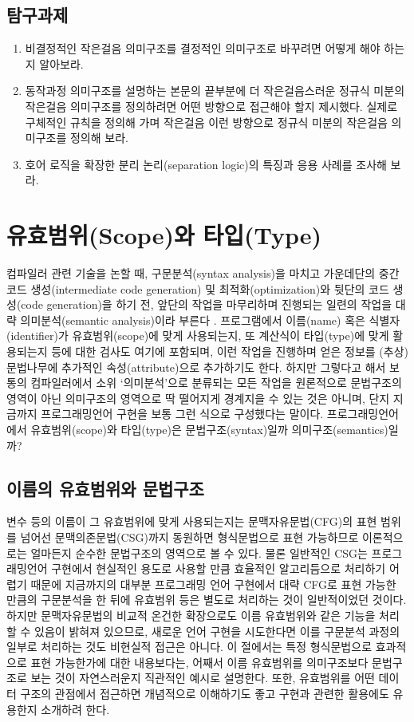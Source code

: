 \section*{탐구과제}
\begin{enumerate}
 \item 비결정적인 작은걸음 의미구조를 결정적인 의미구조로 바꾸려면
       어떻게 해야 하는지 알아보라.
 \item 동작과정 의미구조를 설명하는 본문의 끝부분에 더 작은걸음스러운
       정규식 미분의 작은걸음 의미구조를 정의하려면 어떤 방향으로 접근해야
       할지 제시했다. 실제로 구체적인 규칙을 정의해 가며 작은걸음 이런
       방향으로 정규식 미분의 작은걸음 의미구조를 정의해 보라.
 \item 호어 로직을 확장한 분리 논리(separation logic)의 특징과 응용 사례를 조사해 보라.
\end{enumerate}

\chapter{유효범위(Scope)와 타입(Type)}
컴파일러 관련 기술을 논할 때, 구문분석(syntax analysis)을 마치고
가운데단의 중간 코드 생성(intermediate code generation) 및
최적화(optimization)와 뒷단의 코드 생성(code generation)을 하기 전,
앞단의 작업을 마무리하며 진행되는 일련의 작업을 대략
의미분석(semantic analysis)이라 부른다 \cite{Aho2013compilers2nd}.
프로그램에서 이름(name) 혹은 식별자(identifier)가 유효범위(scope)에
맞게 사용되는지, 또 계산식이 타입(type)에 맞게 활용되는지 등에 대한
검사도 여기에 포함되며, 이런 작업을 진행하며 얻은 정보를 (추상)문법나무에
추가적인 속성(attribute)으로 추가하기도 한다. 하지만 그렇다고 해서
보통의 컴파일러에서 소위 `의미분석'으로 분류되는 모든 작업을 원론적으로
문법구조의 영역이 아닌 의미구조의 영역으로 딱 떨어지게 경계지을 수 있는
것은 아니며, 단지 지금까지 프로그래밍언어 구현을 보통 그런 식으로
구성했다는 말이다. 프로그래밍언어에서 유효범위(scope)와 타입(type)은
문법구조(syntax)일까 의미구조(semantics)일까?

\newpage

\section{이름의 유효범위와 문법구조}
변수 등의 이름이 그 유효범위에 맞게 사용되는지는 문맥자유문법(CFG)의
표현 범위를 넘어선 문맥의존문법(CSG)까지 동원하면 형식문법으로 표현
가능하므로 이론적으로는 얼마든지 순수한 문법구조의 영역으로 볼 수 있다.
물론 일반적인 CSG는 프로그래밍언어 구현에서 현실적인 용도로 사용할 만큼
효율적인 알고리듬으로 처리하기 어렵기 때문에 지금까지의 대부분 프로그래밍
언어 구현에서 대략 CFG로 표현 가능한 만큼의 구문분석을 한 뒤에
유효범위 등은 별도로 처리하는 것이 일반적이었던 것이다. 하지만
문맥자유문법의 비교적 온건한 확장\cite{Okhotin2005existence}으로도
이름 유효범위와 같은 기능을 처리할 수 있음이 밝혀져 있으므로, 새로운
언어 구현을 시도한다면 이를 구문분석 과정의 일부로 처리하는 것도
비현실적 접근은 아니다. 이 절에서는 특정 형식문법으로 효과적으로
표현 가능한가에 대한 내용보다는, 어째서 이름 유효범위를 의미구조보다
문법구조로 보는 것이 자연스러운지 직관적인 예시로 설명한다. 또한,
유효범위를 어떤 데이터 구조의 관점에서 접근하면 개념적으로 이해하기도
좋고 구현과 관련한 활용에도 유용한지 소개하려 한다.

